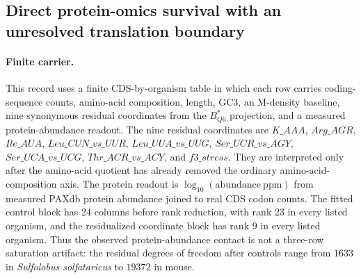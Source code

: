 \subsection{Direct protein-omics survival with an unresolved translation boundary}
\label{sec:q6-direct-protein-omics-survival-with-translation-boundary-cross-layer}

\paragraph{Finite carrier.}
This record uses a finite CDS-by-organism table in which each row carries coding-sequence counts, amino-acid composition, length, GC3, an M-density baseline, nine synonymous residual coordinates from the $B^*_{Q6}$ projection, and a measured protein-abundance readout.  The nine residual coordinates are
$K\_AAA$, $Arg\_AGR$, $Ile\_AUA$, $Leu\_CUN\_vs\_UUR$, $Leu\_UUA\_vs\_UUG$, $Ser\_UCR\_vs\_AGY$, $Ser\_UCA\_vs\_UCG$, $Thr\_ACR\_vs\_ACY$, and $f3\_stress$.
They are interpreted only after the amino-acid quotient has already removed the ordinary amino-acid-composition axis.  The protein readout is $\log_{10}(\mathrm{abundance\ ppm})$ from measured PAXdb protein abundance joined to real CDS codon counts.  The fitted control block has 24 columns before rank reduction, with rank $23$ in every listed organism, and the residualized coordinate block has rank $9$ in every listed organism.  Thus the observed protein-abundance contact is not a three-row saturation artifact: the residual degrees of freedom after controls range from $1633$ in \emph{Sulfolobus solfataricus} to $19372$ in mouse.

